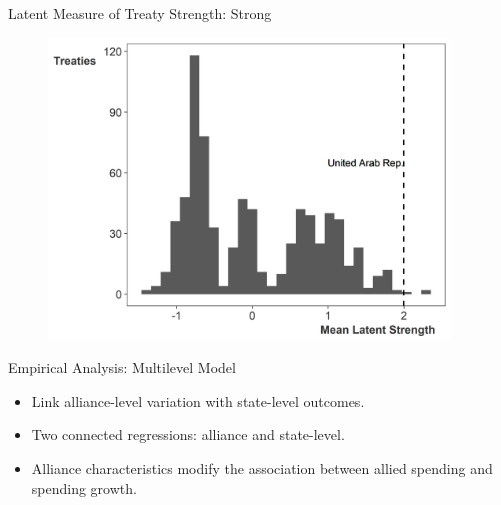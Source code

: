 \documentclass{beamer}
\begin{document}

\begin{frame}{Latent Measure of Treaty Strength: Strong}

\begin{figure}[htbp]
	\centering
		\includegraphics[width=0.95\textwidth]{ls-hist-uar.png}
\end{figure}


\end{frame} 


\begin{frame}{Empirical Analysis: Multilevel Model}

\begin{itemize} 
\item Link alliance-level variation with state-level outcomes. 
\pause
\item Two connected regressions: alliance and state-level. 
\pause 
\item Alliance characteristics modify the association between allied spending and spending growth.  
\end{itemize} 

\end{frame} 


\end{document}

